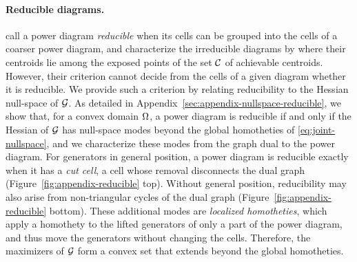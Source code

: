 \documentclass[main.tex]{subfiles}
\begin{document}
\paragraph{Reducible diagrams.}
\citet[\S3.4]{Bourne2026ConvexOrder} call a power diagram \emph{reducible} when its cells can be grouped into the cells of a coarser power diagram, and characterize the irreducible diagrams by where their centroids lie among the exposed points of the set $\mathcal{C}$ of achievable centroids.
However, their criterion cannot decide from the cells of a given diagram whether it is reducible.
We provide such a criterion by relating reducibility to the Hessian null-space of $\mathcal{G}$.
As detailed in Appendix~\ref{sec:appendix-nullspace-reducible}, we show that, for a convex domain $\Omega$, a power diagram is reducible if and only if the Hessian of $\mathcal{G}$ has null-space modes beyond the global homotheties of \eqref{eq:joint-nullspace}, and we characterize these modes from the graph dual to the power diagram.
For generators in general position, a power diagram is reducible exactly when it has a \emph{cut cell}, \ie a cell whose removal disconnects the dual graph (Figure~\ref{fig:appendix-reducible} top).
Without general position, reducibility may also arise from non-triangular cycles of the dual graph (Figure~\ref{fig:appendix-reducible} bottom).
These additional modes are \emph{localized homotheties}, which apply a homothety to the lifted generators of only a part of the power diagram, and thus move the generators without changing the cells.
Therefore, the maximizers of $\mathcal{G}$ form a convex set that extends beyond the global homotheties.
\end{document}
